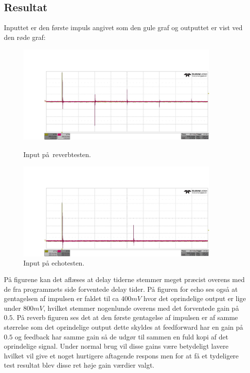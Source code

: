 \subsection{Resultat}
Inputtet er den første impuls angivet som den gule graf og outputtet er vist ved den røde graf:
\begin{figure}[!ht]
		\centering
	\begin{minipage}{0.50\textwidth}
		\centering
		\includegraphics[width=0.9\textwidth, height=5cm]{billeder/reverb.png}
		\caption{Input på reverbtesten.}
	\end{minipage}\hfill
	\begin{minipage}{0.50\textwidth}
		\centering
		\includegraphics[width=0.9\textwidth, height=5 cm]{billeder/echo.png}
		\caption{Input på echotesten.}
	\end{minipage}
\end{figure}
På figurene kan det aflæses at delay tiderne stemmer meget præcist overens med de fra programmets side forventede delay tider. På figuren for echo ses også at gentagelsen af impulsen er faldet til ca $400\si{mV}$ hvor det oprindelige output er lige under $800\si{mV}$, hvilket stemmer nogenlunde overens med det forventede gain på $0.5$.\newline 
På reverb figuren ses det at den første gentagelse af impulsen er af samme størrelse som det oprindelige output dette skyldes at feedforward har en gain på $0.5$ og feedback har samme gain så de udgør til sammen en fuld kopi af det oprindelige signal. 
Under normal brug vil disse gains være betydeligt lavere hvilket vil give et noget hurtigere aftagende respons men for at få et tydeligere test resultat blev disse ret høje gain værdier valgt.
